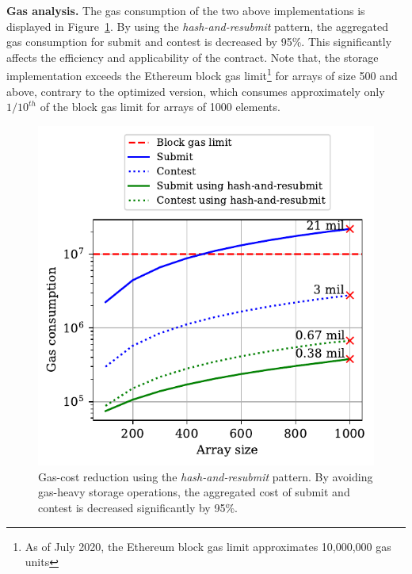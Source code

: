 

\noindent \textbf{Gas analysis.} The gas consumption of the two above
implementations is displayed in Figure~\ref{fig:har-example}. By using the
\emph{hash-and-resubmit} pattern, the aggregated gas consumption for
\textsf{submit} and \textsf{contest} is decreased by 95\%. This significantly
affects the efficiency and applicability of the contract. Note that, the
storage implementation exceeds the Ethereum block gas limit\footnote{As of July
2020, the Ethereum block gas limit approximates 10,000,000 gas units} for
arrays of size 500 and above, contrary to the optimized version, which consumes
approximately only $1/10^{th}$ of the block gas limit for arrays of 1000
elements.

\begin{figure}[h!]
\begin{center}
\includegraphics[width=1 \columnwidth]{figures/har-example.pdf}
\end{center}
\caption{Gas-cost reduction using the \emph{hash-and-resubmit} pattern. By
    avoiding gas-heavy storage operations, the aggregated cost of
    \textsf{submit} and \textsf{contest} is decreased significantly by 95\%.}
\label{fig:har-example}
\end{figure}


